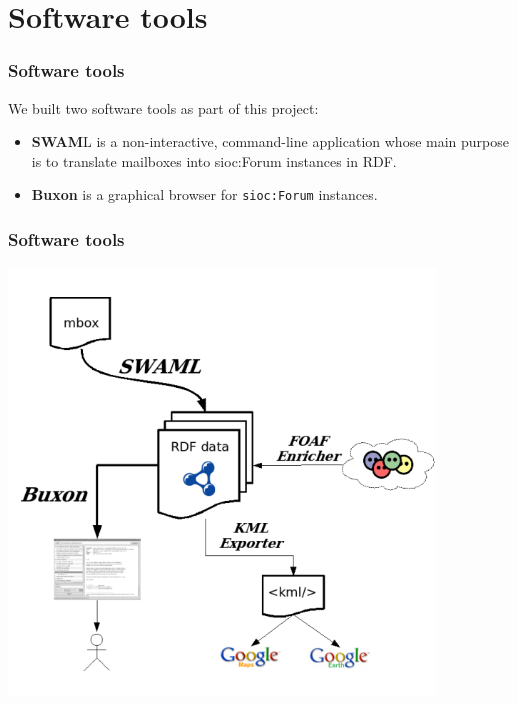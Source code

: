\documentclass[spanish,notes=hide]{beamer}
\begin{document}
\section{Software tools}
\frame
{
  \frametitle{Software tools}

  We built two software tools as part of this project:
  \vspace{0.5cm}
  \begin{itemize}
    \item<2->	\begin{Large}\textbf{SWAM}L is a non-interactive, 
		command-line application whose main purpose is to 
		translate mailboxes into sioc:Forum instances in 
		RDF.\end{Large}
    \vspace{0.5cm}
    \item<3->	\begin{Large}\textbf{Buxon} is a graphical browser 
		for \texttt{sioc:Forum} instances.\end{Large}
  \end{itemize}
}
\frame
{
  \frametitle{Software tools}

  \begin{center}
    \includegraphics[width=0.85\textwidth]{images/swaml-tools.png}
  \end{center}
}
\frame
\end{document}

